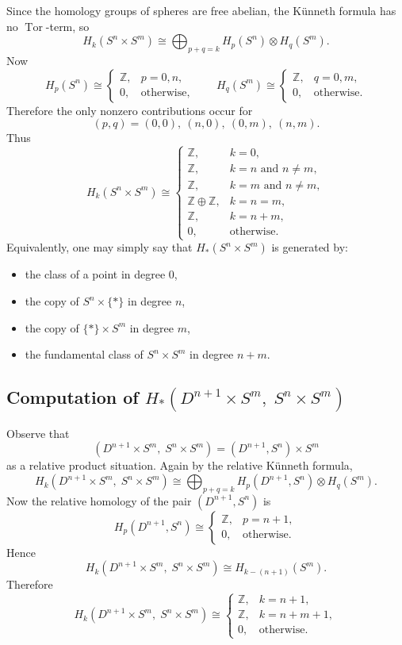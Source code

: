 \documentclass[12pt,a4paper]{article}
\theoremstyle{notespace}
\begin{document}
Since the homology groups of spheres are free abelian, the K\"unneth formula has no \(\operatorname{Tor}\)-term, so
\[
H_k(S^n \times S^m)
\cong
\bigoplus_{p+q=k} H_p(S^n)\otimes H_q(S^m).
\]
Now
\[
H_p(S^n)\cong
\begin{cases}
	\mathbb Z, & p=0,n,\\
	0, & \text{otherwise},
\end{cases}
\qquad
H_q(S^m)\cong
\begin{cases}
	\mathbb Z, & q=0,m,\\
	0, & \text{otherwise}.
\end{cases}
\]
Therefore the only nonzero contributions occur for
\[
(p,q)=(0,0),\ (n,0),\ (0,m),\ (n,m).
\]
Thus
\[
H_k(S^n \times S^m)\cong
\begin{cases}
	\mathbb Z, & k=0,\\[1mm]
	\mathbb Z, & k=n \text{ and } n\neq m,\\[1mm]
	\mathbb Z, & k=m \text{ and } n\neq m,\\[1mm]
	\mathbb Z\oplus \mathbb Z, & k=n=m,\\[1mm]
	\mathbb Z, & k=n+m,\\[1mm]
	0, & \text{otherwise}.
\end{cases}
\]
Equivalently, one may simply say that \(H_*(S^n \times S^m)\) is generated by:
\begin{itemize}
	\item the class of a point in degree \(0\),
	\item the copy of \(S^n \times \{\ast\}\) in degree \(n\),
	\item the copy of \(\{\ast\} \times S^m\) in degree \(m\),
	\item the fundamental class of \(S^n \times S^m\) in degree \(n+m\).
\end{itemize}

\subsection{Computation of \(H_*(D^{n+1} \times S^m,\; S^n \times S^m)\)}

Observe that
\[
(D^{n+1} \times S^m,\; S^n \times S^m)
=
(D^{n+1},S^n)\times S^m
\]
as a relative product situation. Again by the relative K\"unneth formula,
\[
H_k(D^{n+1} \times S^m,\; S^n \times S^m)
\cong
\bigoplus_{p+q=k} H_p(D^{n+1},S^n)\otimes H_q(S^m).
\]
Now the relative homology of the pair \((D^{n+1},S^n)\) is
\[
H_p(D^{n+1},S^n)\cong
\begin{cases}
	\mathbb Z, & p=n+1,\\
	0, & \text{otherwise}.
\end{cases}
\]
Hence
\[
H_k(D^{n+1} \times S^m,\; S^n \times S^m)
\cong
H_{k-(n+1)}(S^m).
\]
Therefore
\[
H_k(D^{n+1} \times S^m,\; S^n \times S^m)
\cong
\begin{cases}
	\mathbb Z, & k=n+1,\\[1mm]
	\mathbb Z, & k=n+m+1,\\[1mm]
	0, & \text{otherwise}.
\end{cases}
\]
\end{document}
